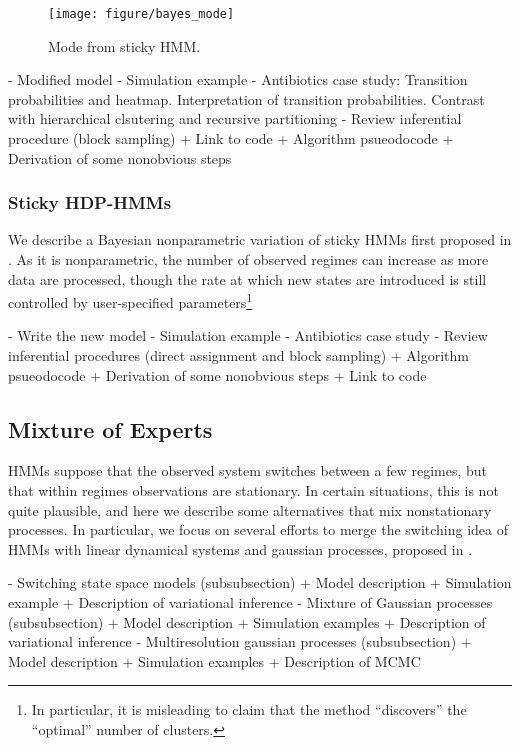 \documentclass{article}
\begin{document}
\begin{figure}[ht]
  \centering
  \texttt{[image: figure/bayes\_mode]}
  \caption{Mode from sticky HMM. \label{fig:bayes_mode} }
\end{figure}


- Modified model
- Simulation example
- Antibiotics case study: Transition probabilities and heatmap. Interpretation
of transition probabilities. Contrast with hierarchical clsutering and recursive
partitioning
- Review inferential procedure (block sampling)
  + Link to code
  + Algorithm psueodocode
  + Derivation of some nonobvious steps

\subsubsection{Sticky HDP-HMMs}

We describe a Bayesian nonparametric variation of sticky HMMs first proposed in
\citep{fox2008hdp}. As it is nonparametric, the number of observed regimes can
increase as more data are processed, though the rate at which new states are
introduced is still controlled by user-specified parameters\footnote{In
  particular, it is misleading to claim that the method ``discovers'' the
  ``optimal'' number of clusters.}

- Write the new model
- Simulation example
- Antibiotics case study
- Review inferential procedures (direct assignment and block sampling)
  + Algorithm psueodocode
  + Derivation of some nonobvious steps
  + Link to code

\subsection{Mixture of Experts}

HMMs suppose that the observed system switches between a few regimes, but that
within regimes observations are stationary. In certain situations, this is not
quite plausible, and here we describe some alternatives that mix nonstationary
processes. In particular, we focus on several efforts to merge the switching idea of
HMMs with linear dynamical systems and gaussian processes, proposed in
\citep{ghahramani1998variational, rasmussen2002infinite, fox2012multiresolution}.

- Switching state space models (subsubsection)
   + Model description
   + Simulation example
   + Description of variational inference
- Mixture of Gaussian processes (subsubsection)
  + Model description
  + Simulation examples
  + Description of variational inference
- Multiresolution gaussian processes (subsubsection)
  + Model description
  + Simulation examples
  + Description of MCMC
\end{document}
